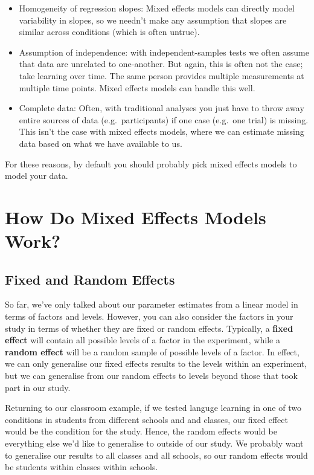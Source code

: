 \documentclass[
]{book}
\begin{document}
\begin{itemize}
\item
  Homogeneity of regression slopes: Mixed effects models can directly model variability in slopes, so we needn't make any assumption that slopes are similar across conditions (which is often untrue).
\item
  Assumption of independence: with independent-samples tests we often assume that data are unrelated to one-another. But again, this is often not the case; take learning over time. The same person provides multiple measurements at multiple time points. Mixed effects models can handle this well.
\item
  Complete data: Often, with traditional analyses you just have to throw away entire sources of data (e.g.~participants) if one case (e.g.~one trial) is missing. This isn't the case with mixed effects models, where we can estimate missing data based on what we have available to us.
\end{itemize}

For these reasons, by default you should probably pick mixed effects models to model your data.

\hypertarget{how-do-mixed-effects-models-work}{%
\section{How Do Mixed Effects Models Work?}\label{how-do-mixed-effects-models-work}}

\hypertarget{fixed-and-random-effects}{%
\subsection{Fixed and Random Effects}\label{fixed-and-random-effects}}

So far, we've only talked about our parameter estimates from a linear model in terms of factors and levels. However, you can also consider the factors in your study in terms of whether they are fixed or random effects. Typically, a \textbf{fixed effect} will contain all possible levels of a factor in the experiment, while a \textbf{random effect} will be a random sample of possible levels of a factor. In effect, we can only generalise our fixed effects results to the levels within an experiment, but we can generalise from our random effects to levels beyond those that took part in our study.

Returning to our classroom example, if we tested languge learning in one of two conditions in students from different schools and and classes, our fixed effect would be the condition for the study. Hence, the random effects would be everything else we'd like to generalise to outside of our study. We probably want to generalise our results to all classes and all schools, so our random effects would be students within classes within schools.
\end{document}
